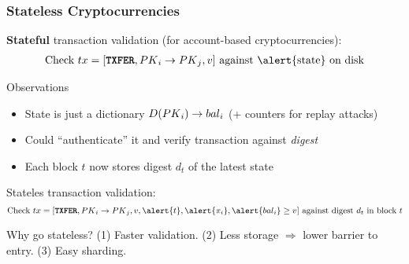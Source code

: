 \begin{frame}
    \frametitle{Stateless Cryptocurrencies}

    \small
    \pause
    \textbf{Stateful} transaction validation (for account-based cryptocurrencies)\pause:
    \begin{align*}
    \text{Check}\ \tx=[\txfer, \PK_i \rightarrow \PK_j, v]\ \text{against \alert{state} on disk}
    \end{align*}
    \pause
    \begin{alertblock}{Observations}
        \pause
        \begin{itemize}
        \item State is just a dictionary $D({PK}_i)\rightarrow {bal}_i$ (+ counters for replay attacks)\pause
        \item Could ``authenticate'' it and verify transaction against \textit{digest}~\cite{Miller12,Todd16,Buterin17,RMCI17}\pause
        \item Each block $t$ now stores digest $d_t$ of the latest state\pause
        \end{itemize}
    \end{alertblock}

    \alert{Stateles} transaction validation\pause:
    \begin{equation*}
    \text{Check}\ \tx=[\txfer, \PK_i \rightarrow \PK_j, v, \alert{t}, \alert{\pi_i}, \alert{\bal_i} \ge v]\ \text{against digest}\ d_t\ \text{in block}\ t
    \end{equation*}
    \pause
    \begin{exampleblock}{Why go stateless?}
        \pause
        (1) Faster validation.\pause\xspace
        (2) Less storage $\Rightarrow$ lower barrier to entry.\pause\xspace
        (3) Easy sharding.
    \end{exampleblock}
\end{frame}

